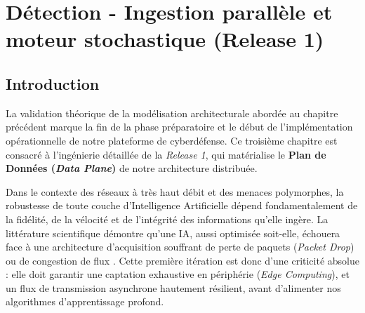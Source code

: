 
\chapter{Détection - Ingestion parallèle et moteur stochastique (Release 1)}
\label{chap:release1}

\minitoc
\newpage

\section{Introduction}

La validation théorique de la modélisation architecturale abordée au chapitre précédent marque la fin de la phase préparatoire et le début de l'implémentation opérationnelle de notre plateforme de cyberdéfense. Ce troisième chapitre est consacré à l'ingénierie détaillée de la \textit{Release 1}, qui matérialise le \textbf{Plan de Données (\textit{Data Plane})} de notre architecture distribuée.

Dans le contexte des réseaux à très haut débit et des menaces polymorphes, la robustesse de toute couche d'Intelligence Artificielle dépend fondamentalement de la fidélité, de la vélocité et de l'intégrité des informations qu'elle ingère. La littérature scientifique démontre qu'une IA, aussi optimisée soit-elle, échouera face à une architecture d'acquisition souffrant de perte de paquets (\textit{Packet Drop}) ou de congestion de flux \cite{brauckhoff2010impact}. Cette première itération est donc d'une criticité absolue : elle doit garantir une captation exhaustive en périphérie (\textit{Edge Computing}), et un flux de transmission asynchrone hautement résilient, avant d'alimenter nos algorithmes d'apprentissage profond.

